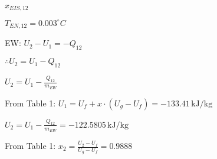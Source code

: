 \( x_{EIS,12} \)  

\( T_{EN,12} = 0.003^\circ C \)  

EW:  
\( U_2 - U_1 = -Q_{12} \)  

\( \therefore U_2 = U_1 - Q_{12} \)  

\( U_2 = U_1 - \frac{Q_{12}}{m_{EW}} \)  

From Table 1:  
\( U_1 = U_f + x \cdot (U_g - U_f) = -133.41 \, \text{kJ/kg} \)  

\( U_2 = U_1 - \frac{Q_{12}}{m_{EW}} = -122.5805 \, \text{kJ/kg} \)  

From Table 1:  
\( x_2 = \frac{U_2 - U_f}{U_g - U_f} = 0.9888 \)